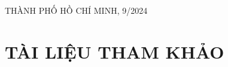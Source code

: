 \documentclass[11pt, a4paper]{article}
\begin{document}
\begin{titlepage}
\vspace{10pt}


\begin{center}
{\footnotesize THÀNH PHỐ HỒ CHÍ MINH, 9/2024}
\end{center}
\end{titlepage}

\tableofcontents
\newpage
\listoffigures
\newpage
{}

\newpage
\section{TÀI LIỆU THAM KHẢO}

\end{document}
